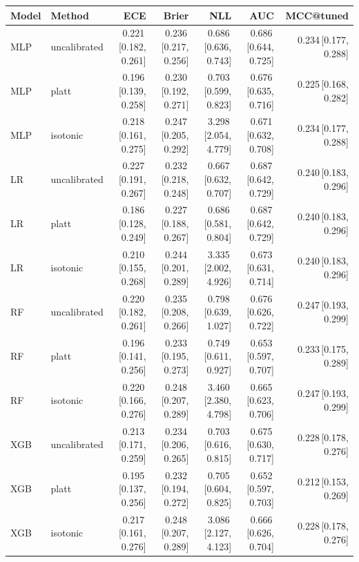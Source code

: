 \small
\begin{tabular}{llrrrrr}
\toprule
Model & Method & ECE & Brier & NLL & AUC & MCC@tuned \\
\midrule
MLP & uncalibrated & 0.221\,{\scriptsize[0.182, 0.261]} & 0.236\,{\scriptsize[0.217, 0.256]} & 0.686\,{\scriptsize[0.636, 0.743]} & 0.686\,{\scriptsize[0.644, 0.725]} & 0.234\,{\scriptsize[0.177, 0.288]} \\
MLP & platt & 0.196\,{\scriptsize[0.139, 0.258]} & 0.230\,{\scriptsize[0.192, 0.271]} & 0.703\,{\scriptsize[0.599, 0.823]} & 0.676\,{\scriptsize[0.635, 0.716]} & 0.225\,{\scriptsize[0.168, 0.282]} \\
MLP & isotonic & 0.218\,{\scriptsize[0.161, 0.275]} & 0.247\,{\scriptsize[0.205, 0.292]} & 3.298\,{\scriptsize[2.054, 4.779]} & 0.671\,{\scriptsize[0.632, 0.708]} & 0.234\,{\scriptsize[0.177, 0.288]} \\
LR & uncalibrated & 0.227\,{\scriptsize[0.191, 0.267]} & 0.232\,{\scriptsize[0.218, 0.248]} & 0.667\,{\scriptsize[0.632, 0.707]} & 0.687\,{\scriptsize[0.642, 0.729]} & 0.240\,{\scriptsize[0.183, 0.296]} \\
LR & platt & 0.186\,{\scriptsize[0.128, 0.249]} & 0.227\,{\scriptsize[0.188, 0.267]} & 0.686\,{\scriptsize[0.581, 0.804]} & 0.687\,{\scriptsize[0.642, 0.729]} & 0.240\,{\scriptsize[0.183, 0.296]} \\
LR & isotonic & 0.210\,{\scriptsize[0.155, 0.268]} & 0.244\,{\scriptsize[0.201, 0.289]} & 3.335\,{\scriptsize[2.002, 4.926]} & 0.673\,{\scriptsize[0.631, 0.714]} & 0.240\,{\scriptsize[0.183, 0.296]} \\
RF & uncalibrated & 0.220\,{\scriptsize[0.182, 0.261]} & 0.235\,{\scriptsize[0.208, 0.266]} & 0.798\,{\scriptsize[0.639, 1.027]} & 0.676\,{\scriptsize[0.626, 0.722]} & 0.247\,{\scriptsize[0.193, 0.299]} \\
RF & platt & 0.196\,{\scriptsize[0.141, 0.256]} & 0.233\,{\scriptsize[0.195, 0.273]} & 0.749\,{\scriptsize[0.611, 0.927]} & 0.653\,{\scriptsize[0.597, 0.707]} & 0.233\,{\scriptsize[0.175, 0.289]} \\
RF & isotonic & 0.220\,{\scriptsize[0.166, 0.276]} & 0.248\,{\scriptsize[0.207, 0.289]} & 3.460\,{\scriptsize[2.380, 4.798]} & 0.665\,{\scriptsize[0.623, 0.706]} & 0.247\,{\scriptsize[0.193, 0.299]} \\
XGB & uncalibrated & 0.213\,{\scriptsize[0.171, 0.259]} & 0.234\,{\scriptsize[0.206, 0.265]} & 0.703\,{\scriptsize[0.616, 0.815]} & 0.675\,{\scriptsize[0.630, 0.717]} & 0.228\,{\scriptsize[0.178, 0.276]} \\
XGB & platt & 0.195\,{\scriptsize[0.137, 0.256]} & 0.232\,{\scriptsize[0.194, 0.272]} & 0.705\,{\scriptsize[0.604, 0.825]} & 0.652\,{\scriptsize[0.597, 0.703]} & 0.212\,{\scriptsize[0.153, 0.269]} \\
XGB & isotonic & 0.217\,{\scriptsize[0.161, 0.276]} & 0.248\,{\scriptsize[0.207, 0.289]} & 3.086\,{\scriptsize[2.127, 4.123]} & 0.666\,{\scriptsize[0.626, 0.704]} & 0.228\,{\scriptsize[0.178, 0.276]} \\
\bottomrule
\end{tabular}
